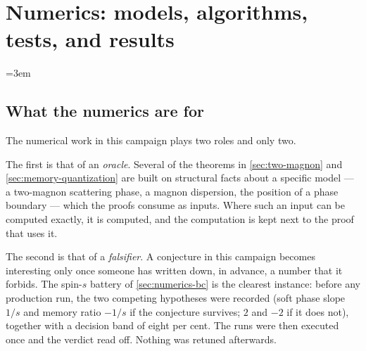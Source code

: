 %

\section{Numerics: models, algorithms, tests, and results}\label{sec:numerics}

\begingroup
\emergencystretch=3em

\subsection{What the numerics are for}\label{sec:numerics-role}

The numerical work in this campaign plays two roles and only two.

The first is that of an \emph{oracle}. Several of the theorems in
\cref{sec:two-magnon} and \cref{sec:memory-quantization} are built on
structural facts about a specific model --- a two-magnon scattering phase, a
magnon dispersion, the position of a phase boundary --- which the proofs
consume as inputs. Where such an input can be computed exactly, it is
computed, and the computation is kept next to the proof that uses it.

The second is that of a \emph{falsifier}. A conjecture in this campaign
becomes interesting only once someone has written down, in advance, a number
that it forbids. The spin-$s$ battery of \cref{sec:numerics-bc} is the
clearest instance: before any production run, the two competing hypotheses
were recorded (soft phase slope $1/s$ and memory ratio $-1/s$ if the
conjecture survives; $2$ and $-2$ if it does not), together with a decision
band of eight per cent. The runs were then executed once and the verdict
read off. Nothing was retuned afterwards.

